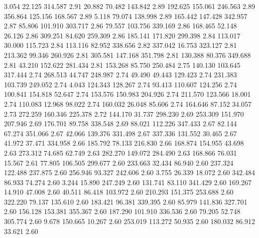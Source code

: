   3.054   22.125  314.587         2.91
  20.882   70.482  143.842         2.89
 192.625  155.061  246.563         2.89
 356.864  125.156  168.567         2.89
   5.118   79.074  138.998         2.89
 165.442  147.428  342.957         2.87
  85.806  101.910  303.717         2.86
  79.557  103.756  339.169         2.86
 168.465   52.148   26.126         2.86
 309.251   84.620  259.309         2.86
 185.141  171.820  299.398         2.84
 113.017   30.000  115.723         2.84
 113.116   82.952  338.656         2.82
 337.042   16.753  323.127         2.81
 213.362   99.346  260.926         2.81
 305.581  147.168  351.798         2.81
 130.388   80.376  349.688         2.81
  43.210  152.622  281.434         2.81
 153.268   85.750  250.484         2.75
 140.130  103.645  317.444         2.74
 268.513   44.747  248.987         2.74
  49.490   49.443  129.423         2.74
 231.383  103.739  249.052         2.74
   4.043  124.343  128.267         2.74
  93.413  110.607  124.256         2.74
 100.841  154.818   52.647         2.74
 153.576  150.983  204.926         2.74
 211.570  123.566   18.001         2.74
 110.083   12.968   98.022         2.74
 160.032   26.048   85.606         2.74
 164.646   87.152   34.057         2.73
 272.259  160.346  225.378         2.72
 144.170   31.737  298.230         2.69
 253.309  151.970  207.946         2.69
 176.701   89.758  338.548         2.69
  88.021  112.226  347.433         2.67
  82.144   67.274  351.066         2.67
  42.066  139.376  331.498         2.67
 337.336  131.552   30.465         2.67
  41.972   37.471  334.958         2.66
 185.792   78.133  216.830         2.66
 168.874  154.955   43.698         2.63
 273.312   74.685   62.749         2.63
 282.270  149.072  284.490         2.63
 168.866   76.031   15.567         2.61
  77.805  106.505  299.677         2.60
 233.663   32.434   86.940         2.60
 237.324  122.488  237.875         2.60
 256.946   93.327  242.606         2.60
   3.755   26.339   18.072         2.60
 342.484   86.933   74.274         2.60
   3.244   15.890  247.249         2.60
 131.741   83.110  341.429         2.60
 169.267   14.910   47.008         2.60
  40.511   86.418  103.972         2.60
 210.293  151.375  253.688         2.60
 322.220   79.137  135.610         2.60
 183.421   96.381  339.395         2.60
  85.979  141.836  327.701         2.60
 156.128  153.381  355.367         2.60
 187.290  101.910  336.536         2.60
  79.205   52.748  305.774         2.60
   9.678  150.665   10.267         2.60
 253.019  113.272   50.935         2.60
 180.032   86.912   33.621         2.60
